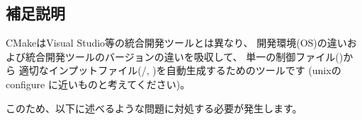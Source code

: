 \subsection{補足説明}
\label{subsec:Background}
\parindent=0pt

CMakeはVisual Studio等の統合開発ツールとは異なり、
開発環境(OS)の違いおよび統合開発ツールのバージョンの違いを吸収して、
単一の制御ファイル(\QCMakeLists{})から
適切なインプットファイル(/,
)を自動生成するためのツールです
(unixのconfigure に近いものと考えてください)。

このため、以下に述べるような問題に対処する必要が発生します。

